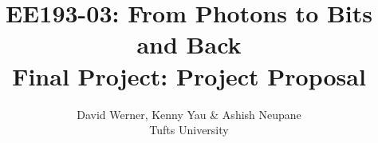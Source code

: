 \documentclass[12pt,onecolumn]{IEEEtran}
\begin{document}
\title{EE193-03: From Photons to Bits and Back\\\LARGE Final Project: Project Proposal}
\author{David Werner, Kenny Yau \& Ashish Neupane\\Tufts University}
\begin{spacing}{1}
\clearpage\maketitle
\end{spacing}\vspace{-2em}



\end{document}
